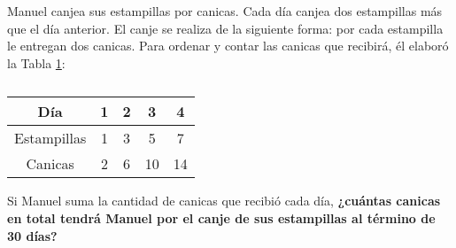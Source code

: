 Manuel canjea sus estampillas por canicas. Cada día canjea dos estampillas más que el día anterior.
El canje se realiza de la siguiente forma: por cada estampilla le entregan dos canicas.
Para ordenar y contar las canicas que recibirá, él elaboró la Tabla \ref{tab:estampillas}:

\begin{table}[H]
    \centering
    \caption{}
    \label{tab:estampillas}
    \begin{tabular}{c|c|c|c|c}
        Día         & 1 & 2 & 3  & 4  \\ \hline
        Estampillas & 1 & 3 & 5  & 7  \\ \hline
        Canicas     & 2 & 6 & 10 & 14
    \end{tabular}
\end{table}

Si Manuel suma la cantidad de canicas que recibió cada día,
\textbf{¿cuántas canicas en total tendrá Manuel por el canje de sus estampillas al término de 30 días?}
